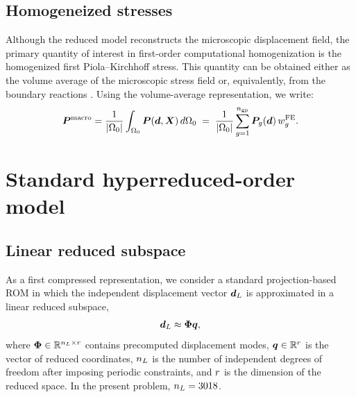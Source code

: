 \documentclass[11pt,a4paper]{article}
\newcommand{\PROMPT}[1]{ }
\begin{document}
\subsection{Homogeneized stresses}
 \label{subsec:homogenized_PK1}


\PROMPT{}


\PROMPT{}

Although the reduced model reconstructs the microscopic displacement field, the
primary quantity of interest in first-order computational homogenization is the
homogenized first Piola--Kirchhoff stress. This quantity can be obtained either
as the volume average of the microscopic stress field or, equivalently, from the
boundary reactions \cite{miehe1999computational}. Using the volume-average representation, we write:
\begin{equation}
\label{eq:macro3}
    \bm{P}^{\mathrm{macro}}
    =
    \frac{1}{|\Omega_0|}
    \int_{\Omega_0} \boldsymbol{P}(\bm{d},\bm{X}) \, d\Omega_0
    \;=\;
    \frac{1}{|\Omega_0|}
    \sum_{g=1}^{n_{\mathrm{gp}}}
    \boldsymbol{P}_g(\bm{d})\,w^{\mathrm{FE}}_{g}.
\end{equation}


\section{Standard hyperreduced-order model }
 \label{sec:standard_ROM}


\PROMPT{}


\subsection{Linear reduced subspace}
\label{subsec:linear_reduced_subspace}

As a first compressed representation, we consider a standard projection-based ROM in which
the independent displacement vector $\bm{d}_L$ is approximated in a linear reduced subspace,
\begin{equation}
    \bm{d}_L \approx \bm{\Phi} \bm{q} ,
    \label{eq:standard_ROM_expansion}
\end{equation}
where $\bm{\Phi}\in\mathbb{R}^{n_L\times r}$ contains precomputed displacement modes,
$\bm{q}\in\mathbb{R}^{r}$ is the vector of reduced coordinates, $n_L$ is the number of
independent degrees of freedom after imposing periodic constraints, and $r$ is the
dimension of the reduced space. In the present problem, $n_L=3018$.
\end{document}
